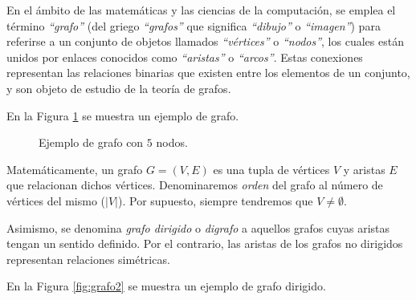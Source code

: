En el ámbito de las matemáticas y las ciencias de la computación, se emplea el término \emph{``grafo''} (del griego \emph{``grafos''} que significa \emph{``dibujo''} o \emph{``imagen''}) para referirse a un conjunto de objetos llamados \emph{``vértices''} o \emph{``nodos''}, los cuales están unidos por enlaces conocidos como \emph{``aristas''} o \emph{``arcos''}. Estas conexiones representan las relaciones binarias que existen entre los elementos de un conjunto, y son objeto de estudio de la teoría de grafos.

En la Figura \ref{fig:grafo1} se muestra un ejemplo de grafo.

\begin{figure}[H]
\centering
{}
\caption{Ejemplo de grafo con $5$ nodos.}
\label{fig:grafo1}
\end{figure}

Matemáticamente, un grafo $G = (V,E)$ es una tupla de vértices $V$ y aristas $E$ que relacionan dichos vértices. Denominaremos  \emph{orden} del grafo al número de vértices del mismo ($|V|$). Por supuesto, siempre tendremos que $V \neq \emptyset$.

Asimismo, se denomina \emph{grafo dirigido} o \emph{digrafo} a aquellos grafos cuyas aristas tengan un sentido definido. Por el contrario, las aristas de los grafos no dirigidos representan relaciones simétricas.

En la Figura \ref{fig:grafo2} se muestra un ejemplo de grafo dirigido.

